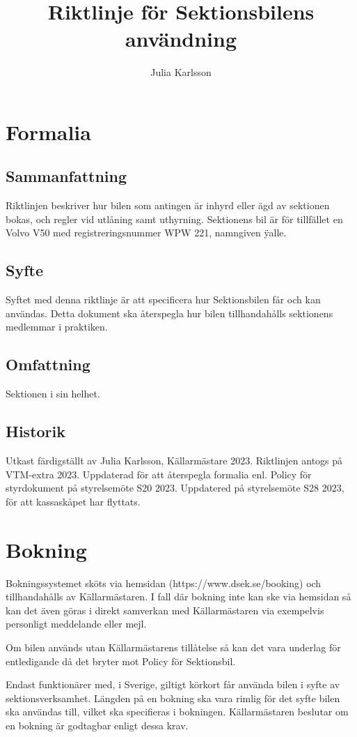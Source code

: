 \documentclass{dsekprotokoll}
\author{Julia Karlsson}
\title{Riktlinje för Sektionsbilens användning}
\begin{document}
\maketitle
\section{Formalia}
\subsection{Sammanfattning}
Riktlinjen beskriver hur bilen som antingen är inhyrd eller ägd av sektionen bokas, och regler vid utlåning samt uthyrning. Sektionens bil är för tillfället en Volvo V50 med registreringsnummer WPW 221, namngiven \"yalle.

\subsection{Syfte}
Syftet med denna riktlinje är att specificera hur Sektionsbilen får och kan användas. Detta dokument ska återspegla hur bilen tillhandahålls sektionens medlemmar i praktiken.

\subsection{Omfattning}
Sektionen i sin helhet.

\subsection{Historik}
Utkast färdigställt av Julia Karlsson, Källarmästare 2023. Riktlinjen antogs på VTM-extra 2023.
Uppdaterad för att återspegla formalia enl. Policy för styrdokument på styrelsemöte S20 2023.
Uppdatered på styrelsemöte S28 2023, för att kassaskåpet har flyttats.

\section{Bokning}
Bokningssystemet sköts via hemsidan (https://www.dsek.se/booking) och tillhandahålls av Källarmästaren. I fall där bokning inte kan ske via hemsidan så kan det även göras i direkt samverkan med Källarmästaren via exempelvis personligt meddelande eller mejl. 

Om bilen används utan Källarmästarens tillåtelse så kan det vara underlag för entledigande då det bryter mot Policy för Sektionsbil. 

Endast funktionärer med, i Sverige, giltigt körkort får använda bilen i syfte av sektionsverksamhet. Längden på en bokning ska vara rimlig för det syfte bilen ska användas till, vilket ska specifieras i bokningen. Källarmästaren beslutar om en bokning är godtagbar enligt dessa krav.
\end{document}
